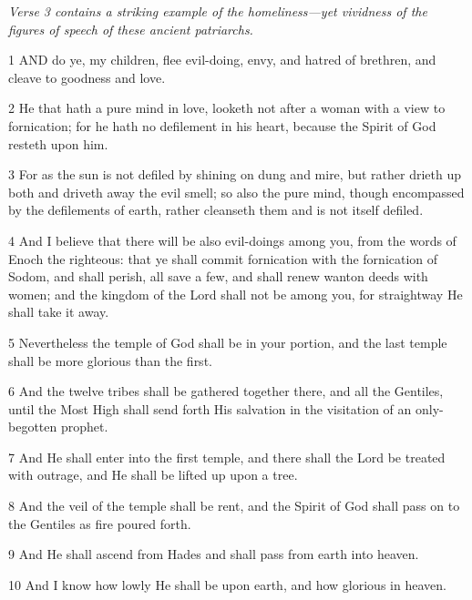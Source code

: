 \par \textit{Verse 3 contains a striking example of the homeliness—yet vividness of the figures of speech of these ancient patriarchs.}

\par 1 AND do ye, my children, flee evil-doing, envy, and hatred of brethren, and cleave to goodness and love.

\par 2 He that hath a pure mind in love, looketh not after a woman with a view to fornication; for he hath no defilement in his heart, because the Spirit of God resteth upon him.

\par 3 For as the sun is not defiled by shining on dung and mire, but rather drieth up both and driveth away the evil smell; so also the pure mind, though encompassed by the defilements of earth, rather cleanseth them and is not itself defiled.

\par 4 And I believe that there will be also evil-doings among you, from the words of Enoch the righteous: that ye shall commit fornication with the fornication of Sodom, and shall perish, all save a few, and shall renew wanton deeds with women; and the kingdom of the Lord shall not be among you, for straightway He shall take it away.

\par 5 Nevertheless the temple of God shall be in your portion, and the last temple shall be more glorious than the first.

\par 6 And the twelve tribes shall be gathered together there, and all the Gentiles, until the Most High shall send forth His salvation in the visitation of an only-begotten prophet.

\par 7 And He shall enter into the first temple, and there shall the Lord be treated with outrage, and He shall be lifted up upon a tree.

\par 8 And the veil of the temple shall be rent, and the Spirit of God shall pass on to the Gentiles as fire poured forth.

\par 9 And He shall ascend from Hades and shall pass from earth into heaven.

\par 10 And I know how lowly He shall be upon earth, and how glorious in heaven.

